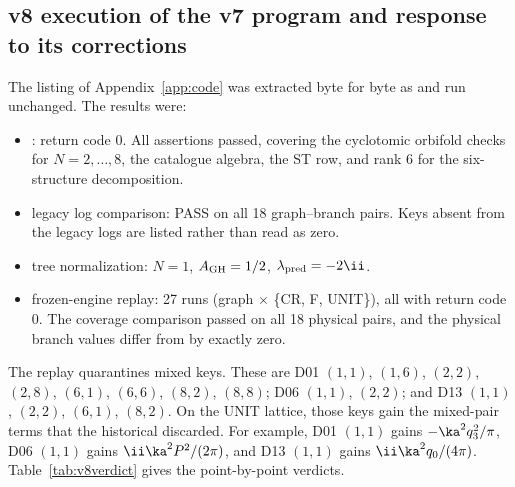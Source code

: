 
\subsection{v8 execution of the v7 program and response to its corrections}
\label{sec:v8response}

The listing of Appendix~\ref{app:code} was extracted byte for byte
as  and run unchanged. The results were:
\begin{itemize}
\item {}: return code 0. All assertions passed,
covering the cyclotomic orbifold checks for \(N=2,\dots,8\), the
catalogue algebra, the ST row, and rank 6 for the six-structure
decomposition.
\item legacy log comparison: PASS on all 18 graph--branch pairs.
Keys absent from the legacy logs are listed rather than read as
zero.
\item tree normalization: \(N=1\), \(A_{\rm GH}=1/2\),
\(\lambda_{\rm pred}=-2\ii\).
\item frozen-engine replay: 27 runs (graph \(\times\)
\{CR, F, UNIT\}), all with return code 0. The coverage
comparison passed on all 18 physical pairs, and the physical
branch values differ from  by exactly zero.
\end{itemize}
The replay quarantines mixed keys. These are D01 \((1,1)\),
\((1,6)\), \((2,2)\), \((2,8)\), \((6,1)\), \((6,6)\), \((8,2)\),
\((8,8)\); D06 \((1,1)\), \((2,2)\); and D13 \((1,1)\), \((2,2)\),
\((6,1)\), \((8,2)\).
On the UNIT lattice, those keys gain the mixed-pair terms that the
historical  discarded. For example, D01 \((1,1)\)
gains \(-\ka^2q_3^2/\pi\), D06 \((1,1)\) gains
\(\ii\ka^2P^2/(2\pi)\), and D13 \((1,1)\) gains
\(\ii\ka^2q_0/(4\pi)\).
Table~\ref{tab:v8verdict} gives the point-by-point verdicts.

